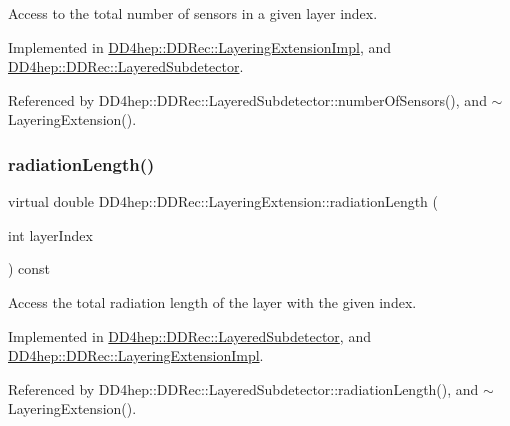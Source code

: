 Access to the total number of sensors in a given layer index. 



Implemented in \hyperlink{class_d_d4hep_1_1_d_d_rec_1_1_layering_extension_impl_a6d5c1cd2069a0af86944ea4aa55357a8}{D\+D4hep\+::\+D\+D\+Rec\+::\+Layering\+Extension\+Impl}, and \hyperlink{class_d_d4hep_1_1_d_d_rec_1_1_layered_subdetector_aab3467193b8abb124076afb0a8642e8e}{D\+D4hep\+::\+D\+D\+Rec\+::\+Layered\+Subdetector}.



Referenced by D\+D4hep\+::\+D\+D\+Rec\+::\+Layered\+Subdetector\+::number\+Of\+Sensors(), and $\sim$\+Layering\+Extension().

\hypertarget{class_d_d4hep_1_1_d_d_rec_1_1_layering_extension_adf915de4949eb6f0406045b4b38dd469}{}\label{class_d_d4hep_1_1_d_d_rec_1_1_layering_extension_adf915de4949eb6f0406045b4b38dd469} 
\subsubsection{\texorpdfstring{radiation\+Length()}{radiationLength()}}
{\footnotesize\ttfamily virtual double D\+D4hep\+::\+D\+D\+Rec\+::\+Layering\+Extension\+::radiation\+Length (\begin{DoxyParamCaption}\item[{int}]{layer\+Index }\end{DoxyParamCaption}) const\hspace{0.3cm}{\ttfamily [pure virtual]}}



Access the total radiation length of the layer with the given index. 



Implemented in \hyperlink{class_d_d4hep_1_1_d_d_rec_1_1_layered_subdetector_addf81ffffc91b391f0ccd62c37a084a1}{D\+D4hep\+::\+D\+D\+Rec\+::\+Layered\+Subdetector}, and \hyperlink{class_d_d4hep_1_1_d_d_rec_1_1_layering_extension_impl_ab858ea839a13b9e62499210f928dc031}{D\+D4hep\+::\+D\+D\+Rec\+::\+Layering\+Extension\+Impl}.



Referenced by D\+D4hep\+::\+D\+D\+Rec\+::\+Layered\+Subdetector\+::radiation\+Length(), and $\sim$\+Layering\+Extension().

